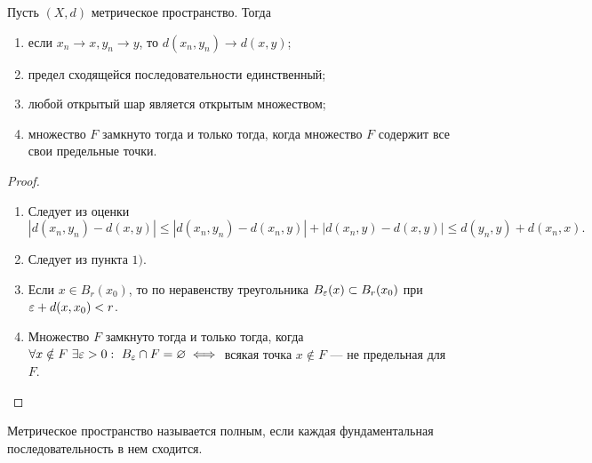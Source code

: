 \documentclass[a4paper]{article}
\theoremstyle{named}
\begin{document}
    \begin{lemma*}
        Пусть $(X, d)$ метрическое пространство. Тогда
        \begin{enumerate}
        \item
            если $x_n \to x, y_n \to y$, то $d(x_n, y_n) \to d(x, y)$;

        \item
            предел сходящейся последовательности единственный;

        \item
            любой открытый шар является открытым множеством;

        \item
            множество $F$ замкнуто тогда и только тогда, когда множество $F$ содержит все свои предельные точки.
        \end{enumerate}

        \begin{proof}
            ~

            \begin{enumerate}
            \item
                Следует из оценки
                \begin{equation*}
                    |d(x_n, y_n) - d(x, y)| \leq |d(x_n, y_n) - d(x_n, y)| + |d(x_n, y) - d(x, y)| \leq d(y_n, y) + d(x_n, x).
                \end{equation*}

            \item
                Следует из пункта $1)$.

            \item
                Если $x \in B_r(x_0)$, то по неравенству треугольника $B_{\varepsilon}(x) \subset B_r(x_0)$ при $\varepsilon + d(x, x_0) < r$.

            \item
                Множество $F$ замкнуто тогда и только тогда, когда $\forall x \notin F \ \exists \varepsilon > 0: \ B_{\varepsilon} \cap F = \varnothing \iff$ всякая точка $x \notin F$ --- не предельная для $F$.
            \end{enumerate}
        \end{proof}
    \end{lemma*}

    \begin{definition*}
        Метрическое пространство называется полным, если каждая фундаментальная последовательность в нем сходится.
    \end{definition*}
\end{document}
